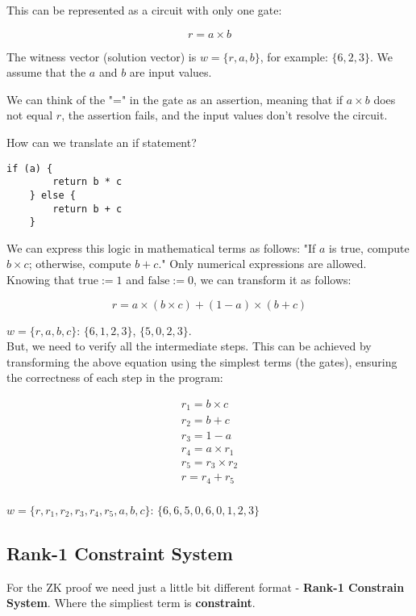 \documentclass[../lecture-notes.tex]{subfiles}
\begin{document}
This can be represented as a circuit with only one gate:

\begin{equation}
    r = a \times b
\end{equation}

The witness vector (solution vector) is $w = \{r, a, b\}$, for example: $\{6, 2, 3\}$. We 
assume that the $a$ and $b$ are input values. 

We can think of the "=" in the gate as an assertion, meaning that if $a \times b$ does not equal
$r$, the assertion fails, and the input values don't resolve the circuit.

How can we translate an if statement?

\begin{lstlisting}[numbers=none]
    if (a) {
        return b * c
    } else {
        return b + c
    }
\end{lstlisting}

We can express this logic in mathematical terms as follows: "If $a$ is true, compute 
$b \times c$; otherwise, compute $b + c$." Only numerical expressions are allowed. Knowing that
$\text{true} := 1$ and $\text{false} := 0$, we can transform it as follows:

\begin{equation}
    r = a \times (b \times c) + (1 - a) \times (b + c)
\end{equation}

$w = \{r, a , b, c\}$: $\{6, 1, 2, 3\}$, $\{5, 0, 2, 3\}$. \\

But, we need to verify all the intermediate steps. This can be achieved by transforming the above
equation using the simplest terms (the gates), ensuring the correctness of each step in the program: 

\begin{equation}
    \begin{aligned}
        r_1 = b \times c \\
        r_2 = b + c \\
        r_3 = 1 - a \\
        r_4 = a \times r_1 \\
        r_5 = r_3 \times r_2 \\
        r = r_4 + r_5 \\
    \end{aligned}
\end{equation}

$w = \{r, r_1, r_2, r_3, r_4, r_5, a , b, c\}$: $\{6, 6, 5, 0, 6, 0, 1, 2, 3\}$ \\

\subsection{Rank-1 Constraint System}

For the ZK proof we need just a little bit different format - \textbf{Rank-1 Constrain System}.
Where the simpliest term is \textbf{constraint}.
\end{document}
